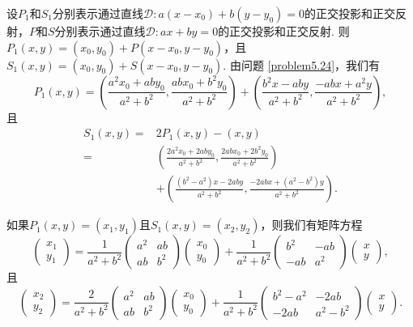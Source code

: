 \begin{solution}
  设$P_1$和$S_1$分别表示通过直线$\mathscr D:a(x-x_0)+b(y-y_0)=0$的正交投影和正交反射，$P$和$S$分别表示通过直线$\mathscr D:ax+by=0$的正交投影和正交反射. 则$P_1(x,y)=(x_0,y_0)+P(x-x_0,y-y_0)$，且$S_1(x,y)=(x_0,y_0)+S
  (x-x_0,y-y_0)$. 由问题 \ref{problem5.24}，我们有
  \[
    P_1(x,y) = \left( \frac{a^2x_0+aby_0}{a^2+b^2},
    \frac{abx_0+b^2y_0}{a^2+b^2} \right) +
    \left( \frac{b^2x - aby}{a^2+b^2},
    \frac{-abx + a^2y}{a^2+b^2} \right) ,
  \]
  且
  \begin{align*}
    S_1(x,y) = {}& 2P_1(x,y) - (x,y) \\
             = {}& \left( \frac{2a^2x_0+2aby_0}{a^2+b^2},
             \frac{2abx_0+2b^2y_0}{a^2+b^2} \right) \\
             & + \left( \frac{(b^2-a^2)x - 2aby}{a^2+b^2}, \frac{-2abx+(a^2-b^2)y}{a^2+b^2} \right).
  \end{align*}

  如果$P_1(x,y)=(x_1,y_1)$且$S_1(x,y)=(x_2,y_2)$，则我们有矩阵方程
  \[
    \begin{pmatrix}
      x_1 \\
      y_1
    \end{pmatrix} = \frac1{a^2+b^2}
    \begin{pmatrix}
      a^2 & ab \\
      ab & b^2
    \end{pmatrix}
    \begin{pmatrix}
      x_0 \\
      y_0
    \end{pmatrix} +
    \frac1{a^2+b^2}
    \begin{pmatrix}
      b^2 & -ab \\
      -ab & a^2
    \end{pmatrix}
    \begin{pmatrix}
      x \\
      y
    \end{pmatrix},
  \]
  且
  \[
    \begin{pmatrix}
      x_2 \\
      y_2
    \end{pmatrix} = \frac2{a^2+b^2}
    \begin{pmatrix}
      a^2 & ab \\
      ab & b^2
    \end{pmatrix}
    \begin{pmatrix}
      x_0 \\
      y_0
    \end{pmatrix} +
    \frac1{a^2+b^2}
    \begin{pmatrix}
      b^2 - a^2 & -2ab \\
      -2ab & a^2 - b^2
    \end{pmatrix}
    \begin{pmatrix}
      x \\
      y
    \end{pmatrix}.
  \]
\end{solution}

